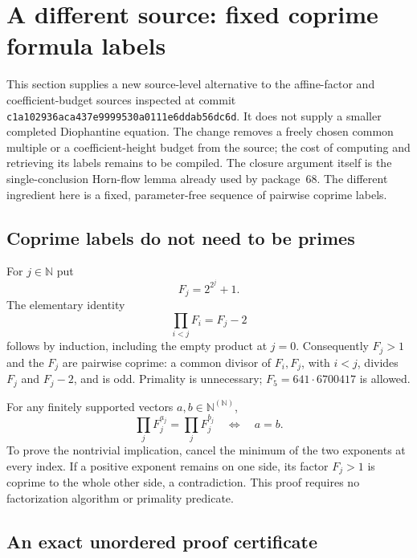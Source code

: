 \section{A different source: fixed coprime formula labels}
\label{sec:fermat-flow}

This section supplies a new source-level alternative to the affine-factor
and coefficient-budget sources inspected at commit
\texttt{c1a102936aca437e9999530a0111e6ddab56dc6d}. It does not supply
a smaller completed Diophantine equation. The change removes a freely
chosen common multiple or a coefficient-height budget from the source;
the cost of computing and retrieving its labels remains to be compiled.
The closure argument itself is the single-conclusion Horn-flow lemma
already used by package~68. The different ingredient here is a fixed,
parameter-free sequence of pairwise coprime labels.

\subsection{Coprime labels do not need to be primes}

For $j\in\mathbb N$ put
\[
 F_j=2^{2^j}+1.
\]
The elementary identity
\[
 \prod_{i<j}F_i=F_j-2
\]
follows by induction, including the empty product at $j=0$.
Consequently $F_j>1$ and the $F_j$ are pairwise coprime: a common divisor
of $F_i,F_j$, with $i<j$, divides $F_j$ and $F_j-2$, and is odd.
Primality is unnecessary; $F_5=641\cdot6700417$ is allowed.

For any finitely supported vectors $a,b\in\mathbb N^{(\mathbb N)}$,
\begin{equation}\label{eq:fermat-injective}
 \prod_jF_j^{a_j}=\prod_jF_j^{b_j}
 \quad\Longleftrightarrow\quad a=b.
\end{equation}
To prove the nontrivial implication, cancel the minimum of the two
exponents at every index. If a positive exponent remains on one side,
its factor $F_j>1$ is coprime to the whole other side, a contradiction.
This proof requires no factorization algorithm or primality predicate.

\subsection{An exact unordered proof certificate}

